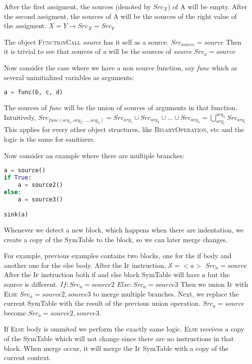 \documentclass[times, twoside, watermark]{zHenriquesLab-StyleBioRxiv}
\begin{document}
After the first assigment, the sources (denoted by $Src_X$) of A will be empty.
After the second assigment, the sources of A will be the sources of the right value of the assigment.
$X = Y \rightarrow Src_X = Src_Y$

The object \textsc{FunctionCall} \textit{source} has it self as a source. $Src_{source} = source$
Then it is trivial to see that sources of \textit{a} will be the sources of \textit{source} $Src_a = source$

Now consider the case where we have a non source function, say \textit{func} which as several uninitialized
variables as arguments:

\begin{lstlisting}[language=Python]
a = func(b, c, d)
\end{lstlisting}

The sources of \textit{func} will be the union of sources of arguments in that function.
Intuitively, $Src_{func(arg_1, arg_2, ..., arg_n)} = Src_{arg_1} \cup Src_{arg_2} \cup ... \cup Src_{arg_n} = \bigcup_{arg_i}^{arg_n} Src_{arg_i} $
This applies for every other object structures, like \textsc{BinaryOperation}, etc and the logic is the
same for sanitizers.

Now consider an example where there are multiple branches:

\begin{lstlisting}[language=Python]
a = source()
if True:
    a = source2()
else:
    a = source3()

sink(a)
\end{lstlisting}

Whenever we detect a new block, which happens when there are indentation, we create a copy of the SymTable
to the block, so we can later merge changes.

For example, previous examples contains two blocks, one for the if body and another one for the else body.
After the \textsc{If} instruction, $\mathcal{S} = <a>$ $Src_a = source$
After the \textsc{If} instruction both if and else block SymTable will have $a$ but the source is different.
$If: Src_a = source2$ $Else: Src_a = source3$
Then we union \textsc{If} with \textsc{Else} $Src_a = source2, source3$ to merge multiple branches.
Next, we replace the current SymTable with the result of the previous union operation. $Src_a = source$ become
$Src_a = source2, source3$.

If \textsc{Else} body is ommited we perform the exactly same logic. \textsc{Else} receives a copy of the SymTable
which will not change since there are no instructions in that block. When merge occur, it will merge the \textsc{If}
SymTable with a copy of the current context.
\end{document}
